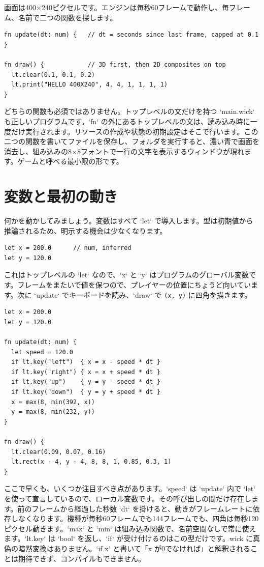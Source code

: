 \noindent
画面は400×240ピクセルです。エンジンは毎秒60フレームで動作し、毎フレーム、名前で二つの関数を探します。

\begin{lstlisting}[language=wick]
fn update(dt: num) {   // dt = seconds since last frame, capped at 0.1
}

fn draw() {            // 3D first, then 2D composites on top
  lt.clear(0.1, 0.1, 0.2)
  lt.print("HELLO 400X240", 4, 4, 1, 1, 1, 1)
}
\end{lstlisting}

\noindent
どちらの関数も必須ではありません。トップレベルの文だけを持つ `main.wick` も正しいプログラムです。`fn` の外にあるトップレベルの文は、読み込み時に一度だけ実行されます。リソースの作成や状態の初期設定はそこで行います。この二つの関数を書いてファイルを保存し、フォルダを実行すると、濃い青で画面を消去し、組み込みの8×8フォントで一行の文字を表示するウィンドウが現れます。ゲームと呼べる最小限の形です。

\section{変数と最初の動き}

何かを動かしてみましょう。変数はすべて `let` で導入します。型は初期値から推論されるため、明示する機会は少なくなります。

\begin{lstlisting}[language=wick]
let x = 200.0      // num, inferred
let y = 120.0
\end{lstlisting}

\noindent
これはトップレベルの `let` なので、`x` と `y` はプログラムのグローバル変数です。フレームをまたいで値を保つので、プレイヤーの位置にちょうど向いています。次に `update` でキーボードを読み、`draw` で \texttt{(x, y)} に四角を描きます。

\begin{lstlisting}[language=wick]
let x = 200.0
let y = 120.0

fn update(dt: num) {
  let speed = 120.0
  if lt.key("left")  { x = x - speed * dt }
  if lt.key("right") { x = x + speed * dt }
  if lt.key("up")    { y = y - speed * dt }
  if lt.key("down")  { y = y + speed * dt }
  x = max(8, min(392, x))
  y = max(8, min(232, y))
}

fn draw() {
  lt.clear(0.09, 0.07, 0.16)
  lt.rect(x - 4, y - 4, 8, 8, 1, 0.85, 0.3, 1)
}
\end{lstlisting}

\noindent
ここで早くも、いくつか注目すべき点があります。`speed` は `update` 内で `let` を使って宣言しているので、ローカル変数です。その呼び出しの間だけ存在します。前のフレームから経過した秒数 `dt` を掛けると、動きがフレームレートに依存しなくなります。機種が毎秒60フレームでも144フレームでも、四角は毎秒120ピクセル動きます。`max` と `min` は組み込み関数で、名前空間なしで常に使えます。`lt.key` は `bool` を返し、`if` が受け付けるのはこの型だけです。wick に真偽の暗黙変換はありません。`if x` と書いて「x が0でなければ」と解釈されることは期待できず、コンパイルもできません。

